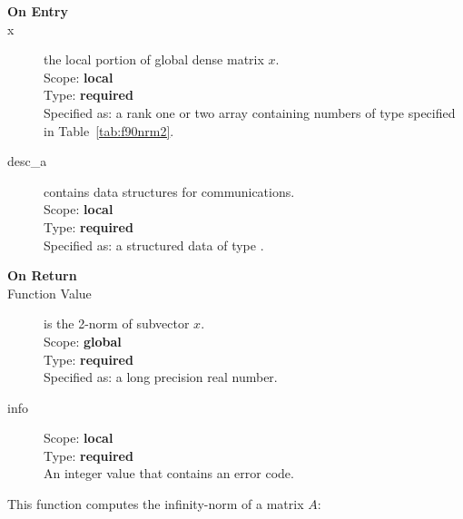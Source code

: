 \begin{description}
\item[\bf On Entry]
\item[x] the local portion of global dense matrix
$x$.%
\\
Scope: {\bf local} \\
Type: {\bf required} \\
Specified as:  a rank one or two array 
containing numbers of type specified in
Table~\ref{tab:f90nrm2}.
\item[desc\_a] contains data structures for communications.\\
Scope: {\bf local} \\
Type: {\bf required}\\
Specified as: a structured data of type \descdata.

\item[\bf On Return] 
\item[Function Value] is the 2-norm of subvector $x$.\\
Scope: {\bf global} \\
Type: {\bf required} \\
Specified as: a long precision real number.
\item[info] 
Scope: {\bf local} \\
Type: {\bf required} \\
An integer value that contains an error code. 
\end{description}

%
%



This function computes the infinity-norm of a matrix $A$:\\

